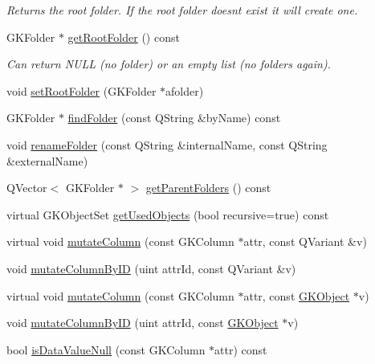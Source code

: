 \begin{DoxyCompactItemize}
\begin{DoxyCompactList}\small\item\em Returns the root folder. If the root folder doesn\textquotesingle{}t exist it will create one. \end{DoxyCompactList}\item 
G\+K\+Folder $\ast$ \hyperlink{classGKObject_a4d404efa6f242bdf3d8a5984578e854b}{get\+Root\+Folder} () const \hypertarget{classGKObject_a4d404efa6f242bdf3d8a5984578e854b}{}\label{classGKObject_a4d404efa6f242bdf3d8a5984578e854b}

\begin{DoxyCompactList}\small\item\em Can return N\+U\+LL (no folder) or an empty list (no folders again). \end{DoxyCompactList}\item 
void \hyperlink{classGKObject_a85e67cb58a286d7c1e212640c1516989}{set\+Root\+Folder} (G\+K\+Folder $\ast$afolder)
\item 
G\+K\+Folder $\ast$ \hyperlink{classGKObject_a0584dde84922527e708fff3bc4ea2053}{find\+Folder} (const Q\+String \&by\+Name) const 
\item 
void \hyperlink{classGKObject_af834154bd1e5db51631820b5a4729b5a}{rename\+Folder} (const Q\+String \&internal\+Name, const Q\+String \&external\+Name)
\item 
Q\+Vector$<$ G\+K\+Folder $\ast$ $>$ \hyperlink{classGKObject_a5c23864ce223cf35232f4f455b26d0a7}{get\+Parent\+Folders} () const 
\item 
virtual G\+K\+Object\+Set \hyperlink{classGKObject_a00c609e3db6da98bc61abf70883c03b2}{get\+Used\+Objects} (bool recursive=true) const 
\item 
virtual void \hyperlink{classGKObject_a9f03837861b142b10ac690b335167fcd}{mutate\+Column} (const G\+K\+Column $\ast$attr, const Q\+Variant \&v)
\item 
void \hyperlink{classGKObject_a1daf48cf86ffa4b66d6bfd40641957a6}{mutate\+Column\+By\+ID} (uint attr\+Id, const Q\+Variant \&v)
\item 
virtual void \hyperlink{classGKObject_a3fdd0ed3d079b17fc1410a453ef86d97}{mutate\+Column} (const G\+K\+Column $\ast$attr, const \hyperlink{classGKObject}{G\+K\+Object} $\ast$v)
\item 
void \hyperlink{classGKObject_aa75d70d3b93b12bf85318ba1e37b08fc}{mutate\+Column\+By\+ID} (uint attr\+Id, const \hyperlink{classGKObject}{G\+K\+Object} $\ast$v)
\item 
bool \hyperlink{classGKObject_a574e6d6ade01718cf6ad0b70a8fa6bb3}{is\+Data\+Value\+Null} (const G\+K\+Column $\ast$attr) const 

\end{DoxyCompactItemize}
